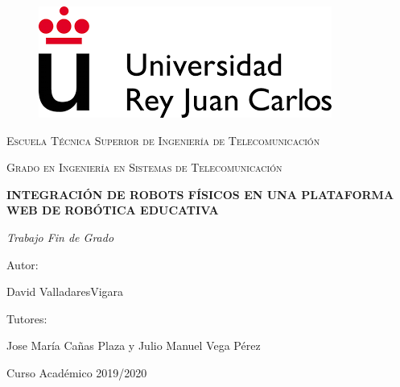 \documentclass{report}
\begin{document}
\begin{titlepage}
\centering

\begin{figure}[t]
\includegraphics[scale=0.5]{images/urjc_logo.png}
\centering
\vspace{0.5cm} %
\end{figure}

{\scshape\Large Escuela Técnica Superior de Ingeniería de Telecomunicación \par}
\vspace{1cm}
{\scshape\Large Grado en Ingeniería en Sistemas de Telecomunicación \par}
\vspace{3cm}
{\bfseries\LARGE INTEGRACIÓN DE ROBOTS FÍSICOS EN UNA PLATAFORMA WEB DE ROBÓTICA EDUCATIVA \par}
\vspace{3cm}
{\itshape\Large Trabajo Fin de Grado \par}
\vfill
{\Large Autor: }
{\Large David ValladaresVigara \par}
{\Large Tutores: }
{\Large Jose María Cañas Plaza y Julio Manuel Vega Pérez \par}
\vfill
{\Large Curso Académico 2019/2020 \par}
\end{titlepage} 

\renewcommand{\abstractname}{\Large Resumen}
\begin{abstract}



\end{abstract}

\setcounter{tocdepth}{3} %
\renewcommand{\contentsname}{Índice general}
\tableofcontents
\clearpage

\renewcommand{\listfigurename}{Índice de figuras}
\listoffigures


\renewcommand{\lstlistingname}{Fragmento}
\renewcommand{\lstlistlistingname}{Indice de Fragmentos}
\lstlistoflistings
\end{document}
